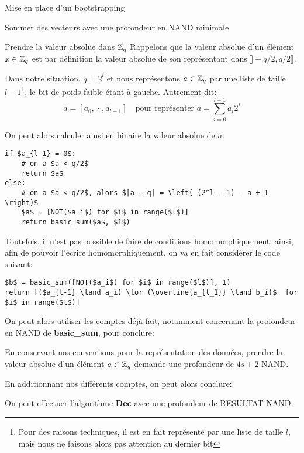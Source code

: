 \begin{section}{Mise en place d'un bootstrapping}
\begin{subsection}{Sommer des vecteurs avec une profondeur en NAND minimale}
\end{subsection}
\begin{subsection}{Prendre la valeur absolue dans $\mathbb{Z}_q$}
	Rappelons que la valeur absolue d'un élément $x\in \mathbb{Z}_q$ est par
	définition la valeur absolue de son représentant dans $\rrbracket -q/2,
	q/2\rrbracket$. 
	
	Dans notre situation, $q = 2^l$ et nous représentons $a\in \mathbb{Z}_q$ par une liste de
	taille $l-1$\footnote{Pour des raisons techniques, il est en fait
	représenté par une liste de taille $l$, mais nous ne faisons alors pas
	attention au dernier bit}, le bit de poids faible étant à gauche.
	Autrement dit:
\[ a = [a_0, \cdots, a_{l-1}] \quad \text{pour représenter } a = \sum_{i=0}^{l-1} a_i 2^i\]

	On peut alors calculer ainsi en binaire la valeur absolue de $a$:

\vspace{0.5cm}
\begin{lstlisting}
if $a_{l-1} = 0$: 
	# on a $a < q/2$
	return $a$
else:
	# on a $a < q/2$, alors $|a - q| = \left( (2^l - 1) - a + 1 \right)$
	$a$ = [NOT($a_i$) for $i$ in range($l$)]
	return basic_sum($a$, $1$)
\end{lstlisting}

Toutefois, il n'est pas possible de faire de conditions homomorphiquement,
ainsi, afin de pouvoir l'écrire homomorphiquement, on va en fait considérer 
le code suivant:

\vspace{0.5cm}
\begin{lstlisting}
$b$ = basic_sum([NOT($a_i$) for $i$ in range($l$)], 1)
return [($a_{l-1} \land a_i) \lor (\overline{a_{l_1}} \land b_i)$  for $i$ in range($l$)]
\end{lstlisting}

On peut alors utiliser les comptes déjà fait, notamment concernant la
	profondeur en NAND de \textbf{basic\_sum}, pour conclure:
\begin{prop}
	En conservant nos conventions pour la représentation des données, prendre la valeur absolue
	d'un élément $a\in \mathbb{Z}_q$ demande une profondeur de $4s + 2$ NAND.
\end{prop}
\end{subsection}
En additionnant nos différents comptes, on peut alors conclure:

\begin{prop}
	On peut effectuer l'algorithme \textbf{Dec} avec une profondeur de
	RESULTAT NAND.
\end{prop}
	




\end{section}
